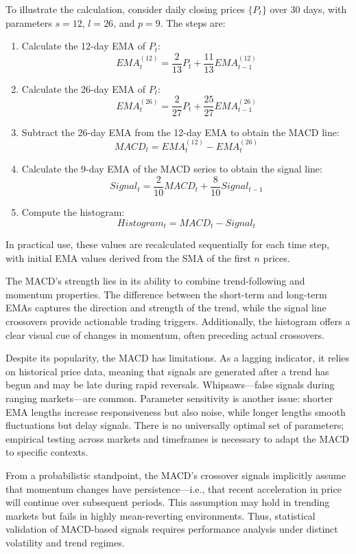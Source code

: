 To illustrate the calculation, consider daily closing prices $\{P_t\}$ over 30 days, with parameters $s=12$, $l=26$, and $p=9$. The steps are:
\begin{enumerate}
    \item Calculate the 12-day EMA of $P_t$:
    \[
    EMA_t^{(12)} = \frac{2}{13} P_t + \frac{11}{13} EMA_{t-1}^{(12)}
    \]
    \item Calculate the 26-day EMA of $P_t$:
    \[
    EMA_t^{(26)} = \frac{2}{27} P_t + \frac{25}{27} EMA_{t-1}^{(26)}
    \]
    \item Subtract the 26-day EMA from the 12-day EMA to obtain the MACD line:
    \[
    MACD_t = EMA_t^{(12)} - EMA_t^{(26)}
    \]
    \item Calculate the 9-day EMA of the MACD series to obtain the signal line:
    \[
    Signal_t = \frac{2}{10} MACD_t + \frac{8}{10} Signal_{t-1}
    \]
    \item Compute the histogram:
    \[
    Histogram_t = MACD_t - Signal_t
    \]
\end{enumerate}
In practical use, these values are recalculated sequentially for each time step, with initial EMA values derived from the SMA of the first $n$ prices.

The MACD's strength lies in its ability to combine trend-following and momentum properties. The difference between the short-term and long-term EMAs captures the direction and strength of the trend, while the signal line crossovers provide actionable trading triggers. Additionally, the histogram offers a clear visual cue of changes in momentum, often preceding actual crossovers.

Despite its popularity, the MACD has limitations. As a lagging indicator, it relies on historical price data, meaning that signals are generated after a trend has begun and may be late during rapid reversals. Whipsaws—false signals during ranging markets—are common. Parameter sensitivity is another issue: shorter EMA lengths increase responsiveness but also noise, while longer lengths smooth fluctuations but delay signals. There is no universally optimal set of parameters; empirical testing across markets and timeframes is necessary to adapt the MACD to specific contexts.

From a probabilistic standpoint, the MACD's crossover signals implicitly assume that momentum changes have persistence—i.e., that recent acceleration in price will continue over subsequent periods. This assumption may hold in trending markets but fails in highly mean-reverting environments. Thus, statistical validation of MACD-based signals requires performance analysis under distinct volatility and trend regimes.

